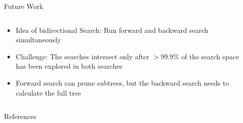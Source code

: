 \begin{frame}{Future Work}
  \vspace{-1.2cm}
  \begin{columns}
    \begin{column}{.49\textwidth}
      \begin{itemize}
        \item<+-> Idea of bidirectional Search: Run forward and backward search simultaneously
        \item<+-> Challenge: The searches intersect only after $> 99.9\%$ of the search space has been explored in both searches
        \item<+-> Forward search can prune subtrees, but the backward search needs to calculate the full tree
      \end{itemize}
    \end{column}
    \begin{column}{.49\textwidth}
    \end{column}
  \end{columns}
\end{frame}

\begin{frame}[shrink=25]{References}
  \nocite{*}
  \printbibliography[heading=none]
\end{frame}

\thanksframe